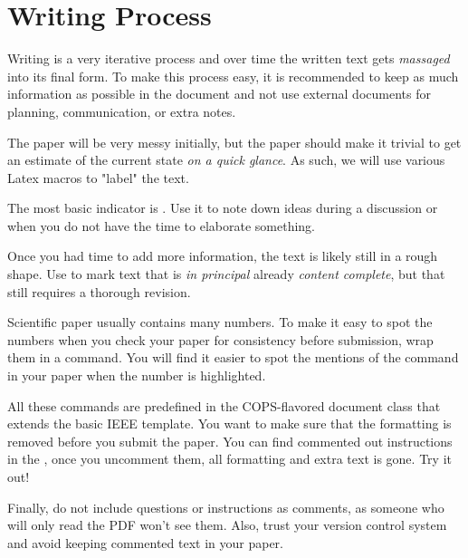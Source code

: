 \section{Writing Process}

Writing is a very iterative process and over time the written text gets \emph{massaged} into its final form.
To make this process easy, it is recommended to keep as much information as possible in the document and not use external documents for planning, communication, or extra notes.

The paper will be very messy initially, but the paper should make it trivial to get an estimate of the current state \emph{on a quick glance}.
As such, we will use various Latex macros to "label" the text.

The most basic indicator is .
Use it to note down ideas during a discussion or when you do not have the time to elaborate something.

Once you had time to add more information, the text is likely still in a rough shape.
Use  to mark text that is \emph{in principal} already \emph{content complete}, but that still requires a thorough revision.

Scientific paper usually contains many numbers.
To make it easy to spot the numbers when you check your paper for consistency before submission, wrap them in a  command.
You will find it easier to spot the  mentions of the  command in your paper when the number is highlighted.

All these commands are predefined in the COPS-flavored document class that extends the basic IEEE template.
You want to make sure that the formatting is removed before you submit the paper.
You can find commented out  instructions in the , once you uncomment them, all formatting and extra text is gone.
Try it out!

Finally, do not include questions or instructions as comments, as someone who will only read the PDF won't see them.
Also, trust your version control system and avoid keeping commented text in your paper.

